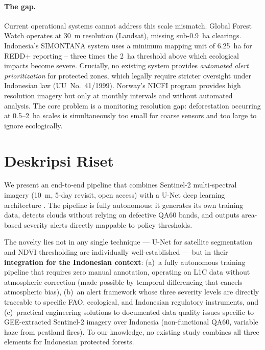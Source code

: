 \documentclass[10pt,a4paper,twocolumn]{article}
\begin{document}
\paragraph{The gap.}
Current operational systems cannot address this scale mismatch.
Global Forest Watch operates at 30~m resolution (Landsat), missing
sub-0.9~ha clearings. Indonesia's SIMONTANA system uses a minimum
mapping unit of 6.25~ha for REDD+ reporting
\cite{gfw2024simontana,unfccc2022indonesia} -- three times the 2~ha threshold above
which ecological impacts become severe. Crucially, no existing
system provides \textit{automated alert prioritization} for
protected zones, which legally require stricter oversight under
Indonesian law (UU~No.~41/1999). Norway's NICFI program \cite{nicfi2020} provides
high resolution imagery but only at monthly intervals and without
automated analysis. The core problem is a monitoring resolution
gap: deforestation occurring at 0.5--2~ha scales is simultaneously
too small for coarse sensors and too large to ignore ecologically.

\section{Deskripsi Riset}
We present an end-to-end pipeline that combines Sentinel-2
multi-spectral imagery (10~m, 5-day revisit, open access) \cite{drusch2012sentinel2} with a
U-Net deep learning architecture \cite{ronneberger2015unet}. The pipeline is fully autonomous:
it generates its own training data, detects clouds without relying
on defective QA60 bands, and outputs area-based severity alerts
directly mappable to policy thresholds.

The novelty lies not in any single technique --- U-Net for
satellite segmentation and NDVI thresholding are individually
well-established --- but in their \textbf{integration for the
Indonesian context}: (a)~a fully autonomous training pipeline that
requires zero manual annotation, operating on L1C data without
atmospheric correction (made possible by temporal differencing
that cancels atmospheric bias), (b)~an alert framework whose three
severity levels are directly traceable to specific FAO, ecological,
and Indonesian regulatory instruments, and (c)~practical
engineering solutions to documented data quality issues specific
to GEE-extracted Sentinel-2 imagery over Indonesia (non-functional
QA60, variable haze from peatland fires). To our knowledge, no
existing study combines all three elements for Indonesian
protected forests.
\end{document}
